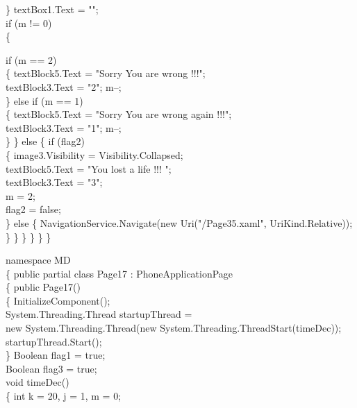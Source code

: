 {{                    
                \}
                textBox1.Text = "";\\
                if (m != 0)\\
                \{

                    if (m == 2)\\
                    \{
                        textBlock5.Text = "Sorry You are wrong !!!";\\
                        textBlock3.Text = "2"; m--;\\
                    \}
                    else if (m == 1)\\
                    \{
                        textBlock5.Text = "Sorry You are wrong again !!!";\\
                        textBlock3.Text = "1"; m--;\\
                    \}
                \}
                else
                \{
                    if (flag2)\\
                    \{
                        image3.Visibility = Visibility.Collapsed;\\
                        textBlock5.Text = "You lost a life !!! ";\\
                        textBlock3.Text = "3";\\
                        m = 2;\\
                        flag2 = false;\\
                    \}
                    else
                    \{
                        NavigationService.Navigate(new Uri("/Page35.xaml", UriKind.Relative));\\
                    \}
                \}
            \}
        \}
    \}
\}


namespace MD\\
\{
    public partial class Page17 : PhoneApplicationPage\\
    \{
        public Page17()\\
        \{
            InitializeComponent();\\
            System.Threading.Thread startupThread =\\
                            new System.Threading.Thread(new System.Threading.ThreadStart(timeDec));\\
            startupThread.Start();\\
        \}
        Boolean flag1 = true;\\
        Boolean flag3 = true;\\
        void timeDec()\\
        \{
            int k = 20, j = 1, m = 0;\\

}}
